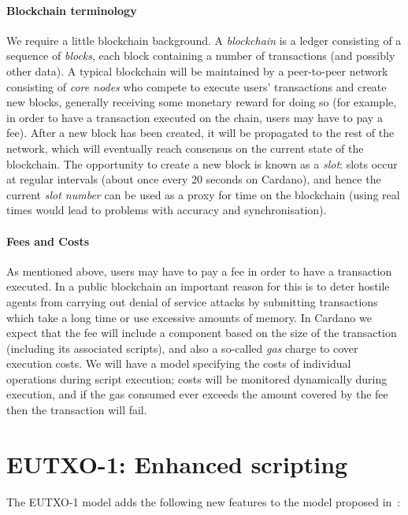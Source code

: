 \documentclass[a4paper]{article}
\theoremstyle{definition}  %
\begin{document}
\paragraph{Blockchain terminology}
\label{sec:blockchain-terminology}
We require a little blockchain background. A \emph{blockchain} is a
ledger consisting of a sequence of \emph{blocks}, each block
containing a number of transactions (and possibly other data).  A
typical blockchain will be maintained by a peer-to-peer network
consisting of \emph{core nodes} who compete to execute users'
transactions and create new blocks, generally receiving some monetary
reward for doing so (for example, in order to have a transaction
executed on the chain, users may have to pay a fee). After a
new block has been created, it will be propagated to the rest of the
network, which will eventually reach consensus on the current state of
the blockchain.  The opportunity to create a new block is known as a
\emph{slot}: slots occur at regular intervals (about once every 20
seconds on Cardano), and hence the current \emph{slot number} can be
used as a proxy for time on the blockchain (using real times would
lead to problems with accuracy and synchronisation).

\paragraph{Fees and Costs}
\label{sec:costs} As mentioned above, users may have to pay a fee in
order to have a transaction executed.  In a public blockchain an
important reason for this is to deter hostile agents from carrying out
denial of service attacks by submitting transactions which take a long
time or use excessive amounts of memory.  In Cardano we expect that
the fee will include a component based on the size of the transaction
(including its associated scripts), and also a so-called \textit{gas}
charge to cover execution costs.  We will have a model specifying the
costs of individual operations during script execution; costs will be
monitored dynamically during execution, and if the gas consumed ever
exceeds the amount covered by the fee then the transaction will fail.


\section{EUTXO-1: Enhanced scripting}
\label{sec:eutxo-1}
The EUTXO-1 model adds the following new features to the model
proposed in~\citep{Zahnentferner18-UTxO}:
\end{document}
